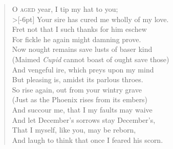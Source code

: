 \documentclass[a5paper, 12pt, oneside]{memoir}
\begin{document}
\PoemTitle{}
\begin{verse}
    \lettrine{O}{ aged} year, I tip my hat to you; \\>[-6pt]
    Your sire has cured me wholly of my love. \\
    Fret not that I such thanks for him eschew \\
    For fickle he again might damning prove. \\
    Now nought remains save lusts of baser kind \\
    (Maimed \textit{Cupid} cannot boast of ought save those) \\
    And vengeful ire, which preys upon my mind \\
    But pleasing is, amidst its parlous throes. \\
    So rise again, out from your wintry grave \\
    (Just as the Phoenix rises from its embers) \\
    And succour me, that I my faults may waive \\
    And let December's sorrows stay December's, \\
    \vin That I myself, like you, may be reborn, \\
    \vin And laugh to think that once I feared his scorn.
\end{verse}
\end{document}
